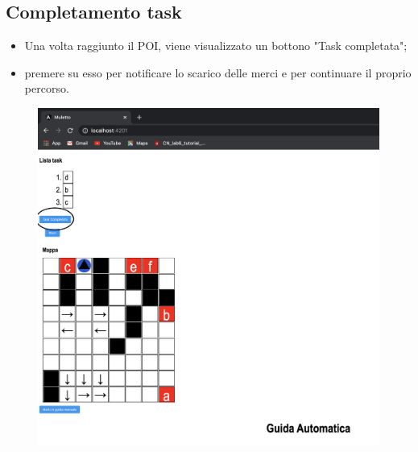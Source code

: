 \subsection{Completamento task}
\begin{itemize}
    \item Una volta raggiunto il POI, viene visualizzato un bottono "Task completata";
    \item premere su esso per notificare lo scarico delle merci e per continuare il proprio percorso.
\end{itemize}
\begin{figure}[H]
    \centering
    \includegraphics[scale=0.4]{res/images/forklift_taskcompletata.png}
\end{figure}
